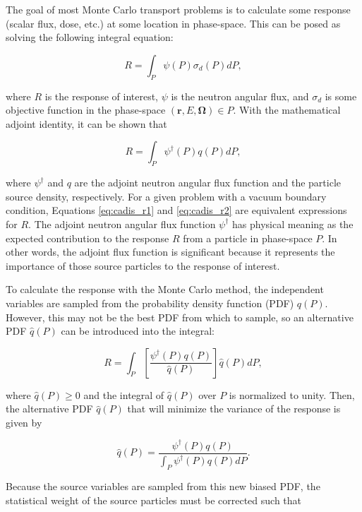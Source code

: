 \documentclass{article} %
\newcommand{\bo}{\mathbf\Omega}
\newcommand{\vecr}{\textbf{r}}
\newcommand{\qhat}{\ensuremath{\hat{q}}}
\begin{document}
The goal of most Monte Carlo transport problems is to calculate some response
(scalar flux, dose, etc.) at some location in phase-space. This can be posed as
solving the following integral equation:

\begin{equation}
R = \int_P \psi(P)\sigma_d(P)dP,
\label{eq:cadis_r1}
\end{equation}

\noindent where $R$ is the response of interest, $\psi$ is the neutron angular
flux, and $\sigma_d$ is some objective function in the phase-space
$(\vecr, E, \bo) \in P$. With the mathematical adjoint identity, it can be
shown that

\begin{equation}
R = \int_P \psi^{\dagger}(P)q(P)dP,
\label{eq:cadis_r2}
\end{equation}

\noindent where $\psi^{\dagger}$ and $q$ are the adjoint neutron angular flux
function and the particle source density, respectively. For a given problem
with a vacuum boundary condition, Equations \ref{eq:cadis_r1} and
\ref{eq:cadis_r2} are equivalent expressions for $R$. The adjoint neutron
angular flux function $\psi^{\dagger}$ has physical meaning as the expected
contribution to the response $R$ from a particle in phase-space $P$. In other
words, the adjoint flux function is significant because it represents the
importance of those source particles to the response of interest.

To calculate the response with the Monte Carlo method, the independent
variables are sampled from the probability density function (PDF) $q(P)$.
However, this may not be the best PDF from which to sample, so an alternative
PDF $\qhat(P)$ can be introduced into the integral:

\begin{equation}
R = \int_P \left[\frac{\psi^{\dagger}(P)q(P)}{\qhat(P)}\right]\qhat(P)dP,
\end{equation}

\noindent where $\qhat(P) \geq 0$ and the integral of $\qhat(P)$ over $P$ is 
normalized to unity. Then, the alternative PDF $\qhat(P)$ that will minimize
the variance of the response is given by

\begin{equation}
\qhat(P) = \frac{\psi^{\dagger}(P)q(P)}{\int_P\psi^{\dagger}(P)q(P)dP}.
\label{eq:qhat}
\end{equation}

Because the source variables are sampled from this new biased PDF, the
statistical weight of the source particles must be corrected such that
\end{document}
